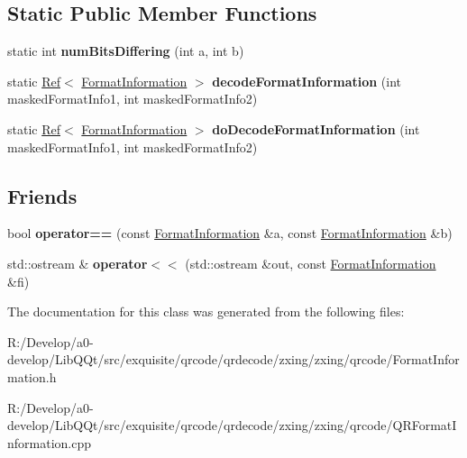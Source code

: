 \subsection*{Static Public Member Functions}
\begin{DoxyCompactItemize}
\item 
\mbox{\label{classzxing_1_1qrcode_1_1_format_information_a0f0011e8eebb053b57e29f3e0b338c3e}} 
static int {\bfseries num\+Bits\+Differing} (int a, int b)
\item 
\mbox{\label{classzxing_1_1qrcode_1_1_format_information_af8dca8f84e0f77b63c20c5c9f7c262ed}} 
static \mbox{\hyperlink{classzxing_1_1_ref}{Ref}}$<$ \mbox{\hyperlink{classzxing_1_1qrcode_1_1_format_information}{Format\+Information}} $>$ {\bfseries decode\+Format\+Information} (int masked\+Format\+Info1, int masked\+Format\+Info2)
\item 
\mbox{\label{classzxing_1_1qrcode_1_1_format_information_ab738187f26d9cde630a37b10194d2938}} 
static \mbox{\hyperlink{classzxing_1_1_ref}{Ref}}$<$ \mbox{\hyperlink{classzxing_1_1qrcode_1_1_format_information}{Format\+Information}} $>$ {\bfseries do\+Decode\+Format\+Information} (int masked\+Format\+Info1, int masked\+Format\+Info2)
\end{DoxyCompactItemize}
\subsection*{Friends}
\begin{DoxyCompactItemize}
\item 
\mbox{\label{classzxing_1_1qrcode_1_1_format_information_aa83f68c9f12c2d7c518d2c64554ee0d4}} 
bool {\bfseries operator==} (const \mbox{\hyperlink{classzxing_1_1qrcode_1_1_format_information}{Format\+Information}} \&a, const \mbox{\hyperlink{classzxing_1_1qrcode_1_1_format_information}{Format\+Information}} \&b)
\item 
\mbox{\label{classzxing_1_1qrcode_1_1_format_information_a4c59e1446be189cefd95e09c0b032b1e}} 
std\+::ostream \& {\bfseries operator$<$$<$} (std\+::ostream \&out, const \mbox{\hyperlink{classzxing_1_1qrcode_1_1_format_information}{Format\+Information}} \&fi)
\end{DoxyCompactItemize}


The documentation for this class was generated from the following files\+:\begin{DoxyCompactItemize}
\item 
R\+:/\+Develop/a0-\/develop/\+Lib\+Q\+Qt/src/exquisite/qrcode/qrdecode/zxing/zxing/qrcode/Format\+Information.\+h\item 
R\+:/\+Develop/a0-\/develop/\+Lib\+Q\+Qt/src/exquisite/qrcode/qrdecode/zxing/zxing/qrcode/Q\+R\+Format\+Information.\+cpp\end{DoxyCompactItemize}

